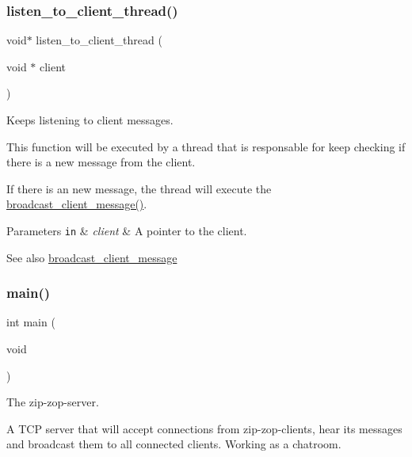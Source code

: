 \subsubsection{\texorpdfstring{listen\+\_\+to\+\_\+client\+\_\+thread()}{listen\_to\_client\_thread()}}
{\footnotesize\ttfamily void$\ast$ listen\+\_\+to\+\_\+client\+\_\+thread (\begin{DoxyParamCaption}\item[{void $\ast$}]{client }\end{DoxyParamCaption})}



Keeps listening to client messages. 

This function will be executed by a thread that is responsable for keep checking if there is a new message from the client.

If there is an new message, the thread will execute the \hyperlink{zip-zop-server_8c_a36e911ded647a0697ca152cae890bcf5}{broadcast\+\_\+client\+\_\+message()}.


\begin{DoxyParams}[1]{Parameters}
\mbox{\tt in}  & {\em client} & A pointer to the client.\\
\hline
\end{DoxyParams}
\begin{DoxySeeAlso}{See also}
\hyperlink{zip-zop-server_8c_a36e911ded647a0697ca152cae890bcf5}{broadcast\+\_\+client\+\_\+message} 
\end{DoxySeeAlso}
\mbox{\label{zip-zop-server_8c_a840291bc02cba5474a4cb46a9b9566fe}} 
\subsubsection{\texorpdfstring{main()}{main()}}
{\footnotesize\ttfamily int main (\begin{DoxyParamCaption}\item[{void}]{ }\end{DoxyParamCaption})}



The zip-\/zop-\/server. 

A T\+CP server that will accept connections from zip-\/zop-\/clients, hear its messages and broadcast them to all connected clients. Working as a chatroom. \mbox{\label{zip-zop-server_8c_a37f14ecc30cc2b45249b544fe70f2b6d}} 
